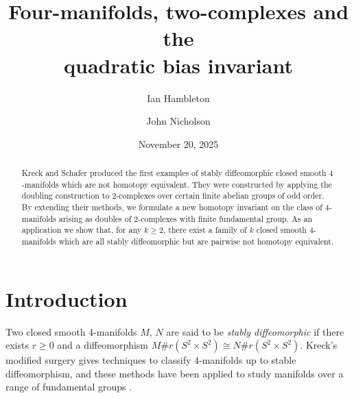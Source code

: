 \documentclass[11pt,a4paper,leqno]{amsart}
\date{November 20, 2025}
\theoremstyle{definition}
\theoremstyle{remark}
\begin{document}
\title[Four-manifolds, two-complexes and the quadratic bias invariant]{Four-manifolds, two-complexes and the \\ quadratic bias invariant}

\author{Ian Hambleton}
\address{Department of Mathematics \& Statistics, McMaster University
L8S 4K1, Ontario, Canada} 

\author{John Nicholson}
\address{School of Mathematics and Statistics, University of Glasgow, United Kingdom}


\begin{abstract} 
Kreck and Schafer produced the first examples of stably diffeomorphic closed smooth $4$-manifolds which are not homotopy equivalent. They were constructed by applying the doubling construction to $2$-complexes over certain finite abelian groups of odd order.
By extending their methods, we formulate a new homotopy invariant on the class of $4$-manifolds arising as doubles of $2$-complexes with finite fundamental group.
As an application we show that, for any $k \ge 2$, there exist a family of $k$ closed smooth $4$-manifolds which are all stably diffeomorphic but are pairwise not homotopy equivalent.
\end{abstract}

\maketitle
\vspace{-5mm}

\section{Introduction} \label{s:intro}

Two closed smooth 4-manifolds $M$, $N$  are said to be \textit{stably diffeomorphic} if there exists $r \ge 0$ and a diffeomorphism $M \# r(S^2 \times S^2) \cong N \# r(S^2 \times S^2)$. Kreck's modified surgery \cite{Kr99} gives techniques to classify $4$-manifolds up to stable diffeomorphism, and these methods have been  applied to study manifolds over a range of fundamental groups \cite{Hambleton:1988,Hambleton:2009,Hambleton:2018,Hambleton:2019,Hambleton:2024,Hambleton:2023,KLPT17,KPT20}.
\end{document}
